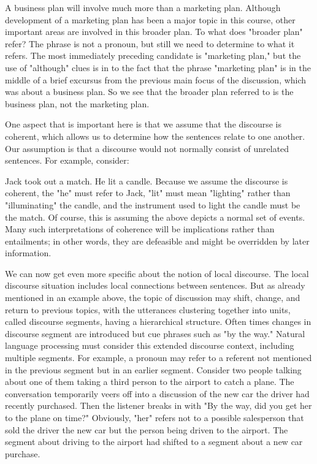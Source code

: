 A business plan will involve much more than a marketing plan. Although development of a marketing plan has been a major topic in this course, other important areas are involved in this broader plan.
To what does "broader plan" refer? The phrase is not a pronoun, but still we need to determine to what it refers. The most immediately preceding candidate is "marketing plan," but the use of "although" clues is in to the fact that the phrase "marketing plan" is in the middle of a brief excursus from the previous main focus of the discussion, which was about a business plan. So we see that the broader plan referred to is the business plan, not the marketing plan.

One aspect that is important here is that we assume that the discourse is coherent, which allows us to determine how the sentences relate to one another. Our assumption is that a discourse would not normally consist of unrelated sentences. For example, consider:

Jack took out a match.
He lit a candle.
Because we assume the discourse is coherent, the "he" must refer to Jack, "lit" must mean "lighting" rather than "illuminating" the candle, and the instrument used to light the candle must be the match. Of course, this is assuming the above depicts a normal set of events. Many such interpretations of coherence will be implications rather than entailments; in other words, they are defeasible and might be overridden by later information.

We can now get even more specific about the notion of local discourse. The local discourse situation includes local connections between sentences. But as already mentioned in an example above, the topic of discussion may shift, change, and return to previous topics, with the utterances clustering together into units, called discourse segments, having a hierarchical structure. Often times changes in discourse segment are introduced but cue phrases such as "by the way." Natural language processing must consider this extended discourse context, including multiple segments. For example, a pronoun may refer to a referent not mentioned in the previous segment but in an earlier segment. Consider two people talking about one of them taking a third person to the airport to catch a plane. The conversation temporarily veers off into a discussion of the new car the driver had recently purchased. Then the listener breaks in with "By the way, did you get her to the plane on time?" Obviously, "her" refers not to a possible salesperson that sold the driver the new car but the person being driven to the airport. The segment about driving to the airport had shifted to a segment about a new car purchase.

